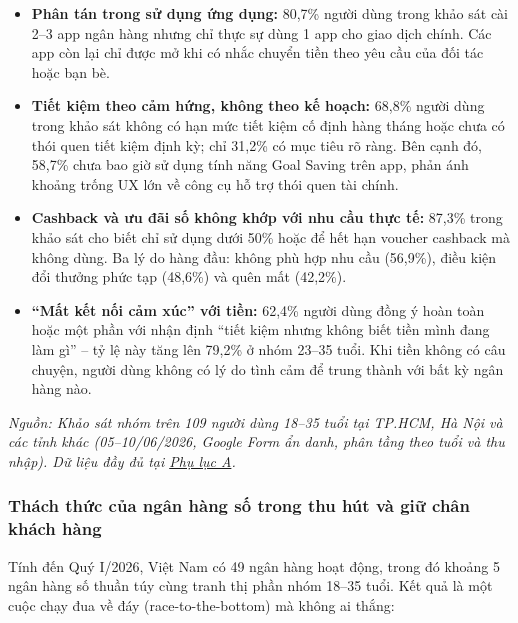 \documentclass[13pt,a4paper]{extarticle}
\begin{document}
\begin{itemize}
    \item \textbf{Phân tán trong sử dụng ứng dụng:} 80,7\% người dùng trong khảo sát cài 2--3 app ngân hàng nhưng chỉ thực sự dùng 1 app cho giao dịch chính. Các app còn lại chỉ được mở khi có nhắc chuyển tiền theo yêu cầu của đối tác hoặc bạn bè.

    \item \textbf{Tiết kiệm theo cảm hứng, không theo kế hoạch:} 68,8\% người dùng trong khảo sát không có hạn mức tiết kiệm cố định hàng tháng hoặc chưa có thói quen tiết kiệm định kỳ; chỉ 31,2\% có mục tiêu rõ ràng. Bên cạnh đó, 58,7\% chưa bao giờ sử dụng tính năng Goal Saving trên app, phản ánh khoảng trống UX lớn về công cụ hỗ trợ thói quen tài chính.

    \item \textbf{Cashback và ưu đãi số không khớp với nhu cầu thực tế:} 87,3\% trong khảo sát cho biết chỉ sử dụng dưới 50\% hoặc để hết hạn voucher cashback mà không dùng. Ba lý do hàng đầu: không phù hợp nhu cầu (56,9\%), điều kiện đổi thưởng phức tạp (48,6\%) và quên mất (42,2\%).

    \item \textbf{``Mất kết nối cảm xúc'' với tiền:} 62,4\% người dùng đồng ý hoàn toàn hoặc một phần với nhận định ``tiết kiệm nhưng không biết tiền mình đang làm gì'' -- tỷ lệ này tăng lên 79,2\% ở nhóm 23--35 tuổi. Khi tiền không có câu chuyện, người dùng không có lý do tình cảm để trung thành với bất kỳ ngân hàng nào.
\end{itemize}

\textit{Nguồn: Khảo sát nhóm trên 109 người dùng 18--35 tuổi tại TP.HCM, Hà Nội và các tỉnh khác (05--10/06/2026, Google Form ẩn danh, phân tầng theo tuổi và thu nhập). Dữ liệu đầy đủ tại \hyperref[phulucA]{Phụ lục A}.}

\subsubsection{Thách thức của ngân hàng số trong thu hút và giữ chân khách hàng}

Tính đến Quý I/2026, Việt Nam có 49 ngân hàng hoạt động, trong đó khoảng 5 ngân hàng số thuần túy cùng tranh thị phần nhóm 18--35 tuổi. Kết quả là một cuộc chạy đua về đáy (race-to-the-bottom) mà không ai thắng:
\end{document}

